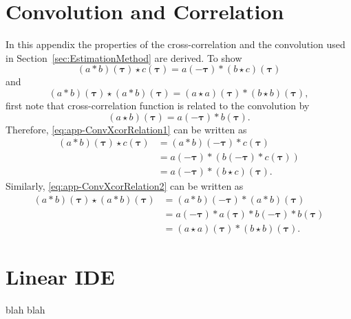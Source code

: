 \documentclass[10pt,twocolumn,twoside]{IEEEtran}
\begin{document}
 \section{Convolution and Correlation}\label{ap:CorrelationAnalysis}
In this appendix the properties of the cross-correlation and the convolution used in Section~\ref{sec:EstimationMethod}   are derived. To show 
\begin{equation}\label{eq:app-ConvXcorRelation1}
 \left(a \ast b \right)\left(\boldsymbol\tau\right)  \star c\left(\boldsymbol\tau\right)  = a\left(-\boldsymbol\tau\right)\ast\left(b \star c\right)\left(\boldsymbol\tau\right)
\end{equation}
and
\begin{equation}\label{eq:app-ConvXcorRelation2}
(a \ast b)(\boldsymbol \tau) \star (a \ast b)(\boldsymbol\tau)=(a \star a)(\boldsymbol\tau)\ast(b \star b)(\boldsymbol\tau),
\end{equation}
first note that cross-correlation function is related to the convolution by \cite{Yarlagadda2009}
\begin{equation}\label{eq:app-ConvXcorRelation}
 \left(a \star b\right)\left(\boldsymbol\tau\right)= a\left(-\boldsymbol\tau\right)\ast b\left(\boldsymbol\tau\right).
\end{equation}
Therefore, \eqref{eq:app-ConvXcorRelation1} can be written as
\begin{align}
 \left(a \ast b\right)\left(\boldsymbol\tau\right) \star c\left(\boldsymbol\tau\right)&= \left(a \ast b\right)\left(-\boldsymbol\tau \right)\ast c\left(\boldsymbol\tau\right) \nonumber \\
&=a\left(-\boldsymbol\tau\right)\ast \left(b\left(-\boldsymbol\tau\right) \ast c\left(\boldsymbol\tau\right)\right)\nonumber \\
&=a\left(-\boldsymbol\tau\right)\ast\left(b\star c\right)\left(\boldsymbol\tau\right).
\end{align}
Similarly, \eqref{eq:app-ConvXcorRelation2} can be written as
\begin{align}
 (a \ast b)(\boldsymbol \tau) \star (a \ast b)(\boldsymbol\tau)&=(a \ast b)(-\boldsymbol\tau) \ast (a \ast b)(\boldsymbol\tau) \nonumber \\
&=a(-\boldsymbol\tau)\ast a(\boldsymbol\tau) \ast b(-\boldsymbol\tau)\ast b(\boldsymbol\tau) \nonumber \\
&=(a \star a)(\boldsymbol\tau)\ast(b \star b)(\boldsymbol\tau).
\end{align}     
 \section{Linear IDE}\label{ap:linearIDE}                
 blah blah
\end{document}
